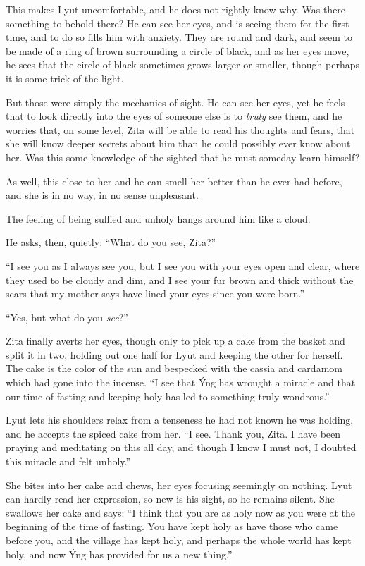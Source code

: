 This makes Lyut uncomfortable, and he does not rightly know why. Was there something to behold there? He can see her eyes, and is seeing them for the first time, and to do so fills him with anxiety. They are round and dark, and seem to be made of a ring of brown surrounding a circle of black, and as her eyes move, he sees that the circle of black sometimes grows larger or smaller, though perhaps it is some trick of the light.

But those were simply the mechanics of sight. He can see her eyes, yet he feels that to look directly into the eyes of someone else is to \emph{truly} see them, and he worries that, on some level, Zita will be able to read his thoughts and fears, that she will know deeper secrets about him than he could possibly ever know about her. Was this some knowledge of the sighted that he must someday learn himself?

As well, this close to her and he can smell her better than he ever had before, and she is in no way, in no sense unpleasant.

The feeling of being sullied and unholy hangs around him like a cloud.

He asks, then, quietly: ``What do you see, Zita?''

``I see you as I always see you, but I see you with your eyes open and clear, where they used to be cloudy and dim, and I see your fur brown and thick without the scars that my mother says have lined your eyes since you were born.''

``Yes, but what do you \emph{see}?''

Zita finally averts her eyes, though only to pick up a cake from the basket and split it in two, holding out one half for Lyut and keeping the other for herself. The cake is the color of the sun and bespecked with the cassia and cardamom which had gone into the incense. ``I see that Ýng has wrought a miracle and that our time of fasting and keeping holy has led to something truly wondrous.''

Lyut lets his shoulders relax from a tenseness he had not known he was holding, and he accepts the spiced cake from her. ``I see. Thank you, Zita. I have been praying and meditating on this all day, and though I know I must not, I doubted this miracle and felt unholy.''

She bites into her cake and chews, her eyes focusing seemingly on nothing. Lyut can hardly read her expression, so new is his sight, so he remains silent. She swallows her cake and says: ``I think that you are as holy now as you were at the beginning of the time of fasting. You have kept holy as have those who came before you, and the village has kept holy, and perhaps the whole world has kept holy, and now Ýng has provided for us a new thing.''

